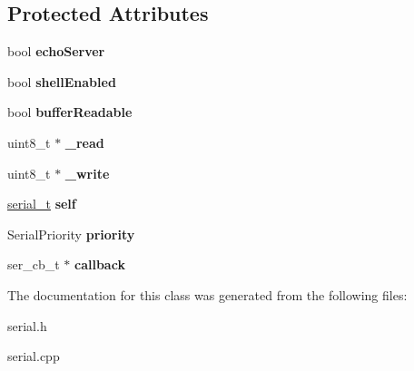 \subsection*{Protected Attributes}
\begin{DoxyCompactItemize}
\item 
\mbox{\label{classSerial_a71585071c3169b915300f84557d273d3}} 
bool {\bfseries echo\+Server}
\item 
\mbox{\label{classSerial_a3ae40010a266baadc7a7d1c655d0f3ab}} 
bool {\bfseries shell\+Enabled}
\item 
\mbox{\label{classSerial_a58f8acbb0746b9dce8992d68ab380098}} 
bool {\bfseries buffer\+Readable}
\item 
\mbox{\label{classSerial_a461b01260601124608caefb58aa97321}} 
uint8\+\_\+t $\ast$ {\bfseries \+\_\+read}
\item 
\mbox{\label{classSerial_adf357435a54ad0273470165af0b32b40}} 
uint8\+\_\+t $\ast$ {\bfseries \+\_\+write}
\item 
\mbox{\label{classSerial_ace848b00193579670c9092e2866b04c5}} 
\hyperlink{structserial__t}{serial\+\_\+t} {\bfseries self}
\item 
\mbox{\label{classSerial_a456da36721b84dab734da1b47e39545e}} 
Serial\+Priority {\bfseries priority}
\item 
\mbox{\label{classSerial_aa18535152da1ad701fc2470451974c32}} 
ser\+\_\+cb\+\_\+t $\ast$ {\bfseries callback}
\end{DoxyCompactItemize}


The documentation for this class was generated from the following files\+:\begin{DoxyCompactItemize}
\item 
serial.\+h\item 
serial.\+cpp\end{DoxyCompactItemize}
